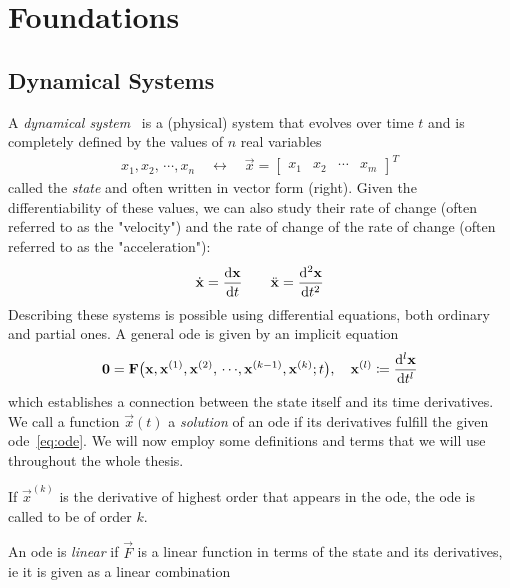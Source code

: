 \chapter{Foundations}
	\label{c:foundations}

	\section{Dynamical Systems}
		A \emph{dynamical system}~\cite{birkhoffDynamicalSystems1927} is a (physical) system that evolves over time \(t\) and is completely defined by the values of \(n\) real variables
		\begin{align*}
			x_1, x_2, \,\cdots\!, x_n \quad\longleftrightarrow\quad \vec{x} = \begin{bmatrix} x_1 & x_2 & \cdots & x_m \end{bmatrix}^T
		\end{align*}
		called the \emph{state} and often written in vector form (right). Given the differentiability of these values, we can also study their rate of change (often referred to as the "velocity") and the rate of change of the rate of change (often referred to as the "acceleration"):
		\begin{align*}
			\dot{\boldsymbol{\mathrm{x}}} = \dv{\boldsymbol{\mathrm{x}}}{t} \qquad \ddot{\boldsymbol{\mathrm{x}}} = \dv[2]{\boldsymbol{\mathrm{x}}}{t}
		\end{align*}
		Describing these systems is possible using differential equations, both ordinary and partial ones. A general \ac{ode} is given by an implicit equation
		\begin{align}
			\boldsymbol{\mathrm{0}} = \boldsymbol{\mathrm{F}}\big( \boldsymbol{\mathrm{x}}, \boldsymbol{\mathrm{x}}^{(1)}, \boldsymbol{\mathrm{x}}^{(2)}, \,\cdots\!, \boldsymbol{\mathrm{x}}^{(k - 1)}, \boldsymbol{\mathrm{x}}^{(k)}; t \big),\quad \boldsymbol{\mathrm{x}}^{(l)} \coloneqq \dv[l]{\boldsymbol{\mathrm{x}}}{t}  \label{eq:ode}
		\end{align}
		which establishes a connection between the state itself and its time derivatives. We call a function \( \vec{x}(t) \) a \emph{solution} of an \ac{ode} if its derivatives fulfill the given \ac{ode}~\eqref{eq:ode}. We will now employ some definitions and terms that we will use throughout the whole thesis.
		\begin{description}[leftmargin = 3cm]
			\item[Order] If \( \vec{x}^{(k)} \) is the derivative of highest order that appears in the \ac{ode}, the \ac{ode} is called to be of order \(k\).
			\item[Linearity] An \ac{ode} is \emph{linear} if \(\vec{F}\) is a linear function in terms of the state and its derivatives, \ac{ie} it is given as a linear combination
		\end{description}
